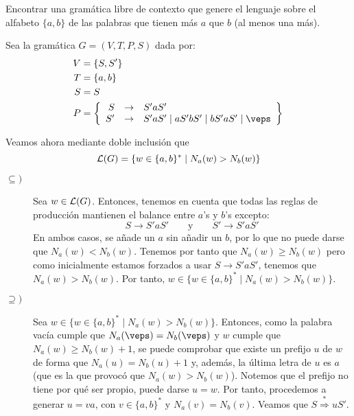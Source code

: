 \begin{ejercicio}\label{ej:1.1.5}
    Encontrar una gramática libre de contexto que genere el lenguaje sobre el alfabeto $\{a, b\}$ de las palabras que tienen más $a$ que $b$ (al menos una más).

    Sea la gramática $G=\left(V,T,P,S\right)$ dada por:
    \begin{align*}
        V &= \{S, S'\} \\
        T &= \{a,b\} \\
        S &= S \\
        P &= \left\{
            \begin{array}{rcl}
                S &\rightarrow & S'aS'\\
                S' &\rightarrow & S'aS' \mid aS'bS' \mid bS'aS' \mid \veps
            \end{array}
        \right\}
    \end{align*}

    Veamos ahora mediante doble inclusión que $$\mathcal{L}(G)=\{w\in \{a,b\}^\ast \mid N_a(w)>N_b(w)\}$$
    \begin{description}
        \item[$\subseteq)$] Sea $w\in \mathcal{L}(G)$. Entonces, tenemos en cuenta que todas las reglas de producción mantienen el balance entre $a$'s y $b$'s excepto:
        \begin{equation*}
            S \rightarrow S'aS'
            \qquad \text{y} \qquad
            S' \rightarrow S'aS'
        \end{equation*}
        En ambos casos, se añade un $a$ sin añadir un $b$, por lo que no puede darse que $N_a(w)<N_b(w)$. Tenemos por tanto que $N_a(w)\geq N_b(w)$ pero como inicialmente estamos forzados a usar $S\rightarrow S'aS'$, tenemos que $N_a(w)>N_b(w)$. Por tanto, $w\in \{w\in \{a,b\}^\ast \mid N_a(w)>N_b(w)\}$.

        \item[$\supseteq)$] Sea $w\in \{w\in \{a,b\}^\ast \mid N_a(w)>N_b(w)\}$. Entonces, como la palabra vacía cumple que $N_a(\veps)=N_b(\veps)$ y $w$ cumple que $N_a(w)\geq N_b(w)+1$, se puede comprobar que existe un prefijo $u$ de $w$ de forma que $N_a(u)=N_b(u)+1$ y, además, la última letra de $u$ es $a$ (que es la que provocó que $N_a(w)>N_b(w)$). Notemos que el prefijo no tiene por qué ser propio, puede darse $u=w$. Por tanto, procedemos a generar $u=va$, con $v\in \{a,b\}^\ast$ y $N_a(v)=N_b(v)$. Veamos que $S \stackrel{\ast}{\Longrightarrow} uS'$.
        

\end{description}
\end{ejercicio}

